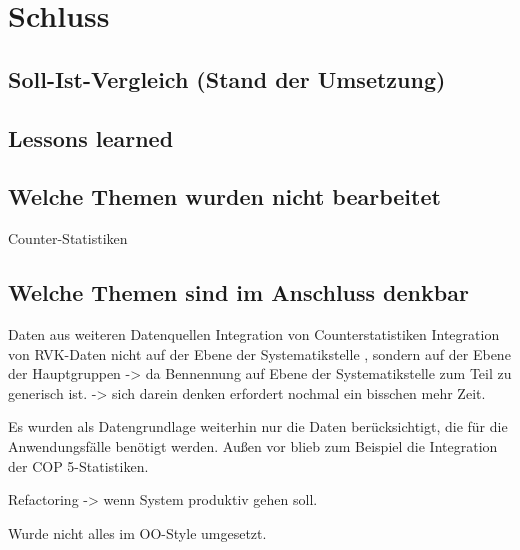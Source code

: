 
\chapter{Schluss}
\label{chap:six}
\section{Soll-Ist-Vergleich (Stand der Umsetzung)}
\section{Lessons learned}
\section{Welche Themen wurden nicht bearbeitet}
Counter-Statistiken

\section{Welche Themen sind im Anschluss denkbar}
Daten aus weiteren Datenquellen
Integration von Counterstatistiken
Integration von RVK-Daten nicht auf der Ebene der Systematikstelle , sondern auf der Ebene
der Hauptgruppen -> da Bennennung auf Ebene der Systematikstelle zum Teil zu generisch ist. 
-> sich darein denken erfordert nochmal ein bisschen mehr Zeit.

Es wurden als Datengrundlage weiterhin nur die Daten berücksichtigt, 
    die für die Anwendungsfälle benötigt werden. Außen vor blieb zum Beispiel die Integration der \acrshort{COP 5}-Statistiken.

Refactoring -> wenn System produktiv gehen soll.

Wurde nicht alles im OO-Style umgesetzt.